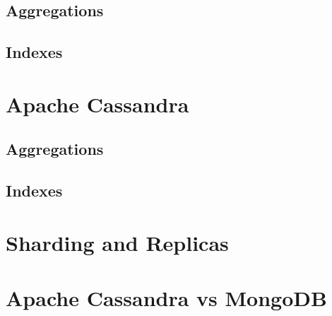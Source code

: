 \subsection{Aggregations}
\subsection{Indexes}

\section{Apache Cassandra}
\subsection{Aggregations}
\subsection{Indexes}

\section{Sharding and Replicas}

\section{Apache Cassandra vs MongoDB}
